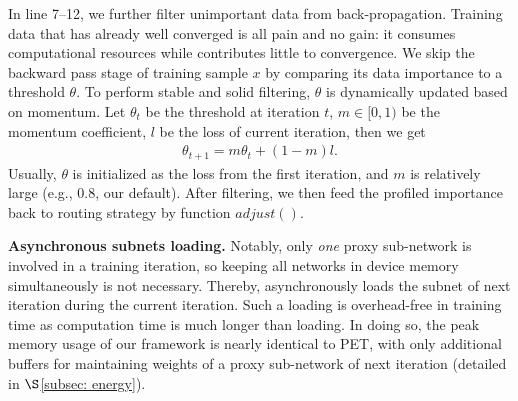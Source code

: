 % 
In line 7--12, we further filter unimportant data from back-propagation.
Training data that has already well converged is all pain and no gain: it consumes computational resources while contributes little to convergence.
We skip the backward pass stage of training sample $x$ by comparing its data importance to a threshold $\theta$.
To perform stable and solid filtering, $\theta$ is dynamically updated based on momentum.
Let $\theta_{t}$ be the threshold at iteration $t$, $m\in[0, 1)$ be the momentum coefficient, $l$ be the loss of current iteration, then we get
\begin{align}
	\theta_{t+1} = m\theta_{t} + (1-m)l.
	\label{eq-filter_thres}
\end{align}
Usually, $\theta$ is initialized as the loss from the first iteration, and $m$ is relatively large (e.g., 0.8, our default).
After filtering, we then feed the profiled importance back to routing strategy by function $adjust()$.

\noindent \textbf{Asynchronous subnets loading. }
Notably, only \textit{one} proxy sub-network is involved in a training iteration, so keeping all networks in device memory simultaneously is not necessary.
Thereby, \sys asynchronously loads the subnet of next iteration during the current iteration.
Such a loading is overhead-free in training time as computation time is much longer than loading.
In doing so, the peak memory usage of our framework is nearly identical to PET, with only additional buffers for maintaining weights of a proxy sub-network of next iteration (detailed in $\S$\ref{subsec: energy}).


